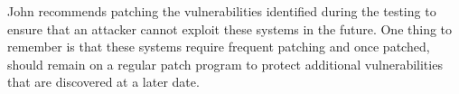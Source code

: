 John recommends patching the vulnerabilities identified during the testing to ensure that an attacker cannot exploit these systems in the future. One thing to remember is that these systems require frequent patching and once patched, should remain on a regular patch program to protect additional vulnerabilities that are discovered at a later date.